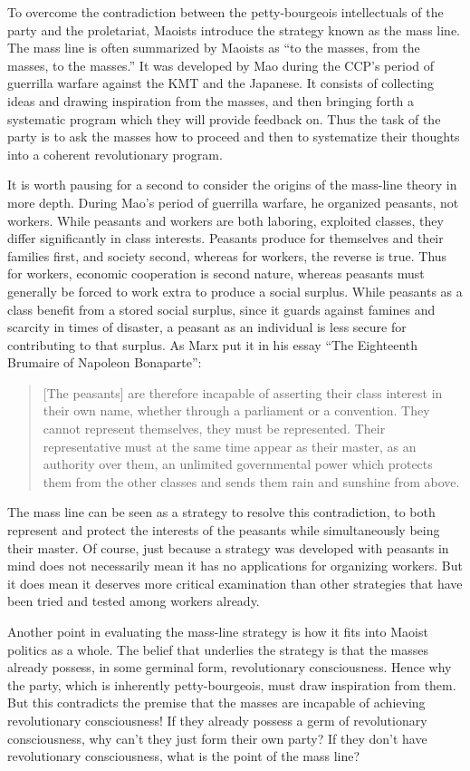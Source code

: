 To overcome the contradiction between the petty-bourgeois intellectuals of the party and the proletariat, Maoists introduce the strategy known as the mass line. The mass line is often summarized by Maoists as ``to the masses, from the masses, to the masses.'' It was developed by Mao during the CCP's period of guerrilla warfare against the KMT and the Japanese. It consists of collecting ideas and drawing inspiration from the masses, and then bringing forth a systematic program which they will provide feedback on. Thus the task of the party is to ask the masses how to proceed and then to systematize their thoughts into a coherent revolutionary program.

It is worth pausing for a second to consider the origins of the mass-line theory in more depth. During Mao's period of guerrilla warfare, he organized peasants, not workers. While peasants and workers are both laboring, exploited classes, they differ significantly in class interests. Peasants produce for themselves and their families first, and society second, whereas for workers, the reverse is true. Thus for workers, economic cooperation is second nature, whereas peasants must generally be forced to work extra to produce a social surplus. While peasants as a class benefit from a stored social surplus, since it guards against famines and scarcity in times of disaster, a peasant as an individual is less secure for contributing to that surplus. As Marx put it in his essay ``The Eighteenth Brumaire of Napoleon Bonaparte'':

\blockquote{[The peasants] are therefore incapable of asserting their class interest in their own name, whether through a parliament or a convention. They cannot represent themselves, they must be represented. Their representative must at the same time appear as their master, as an authority over them, an unlimited governmental power which protects them from the other classes and sends them rain and sunshine from above.}

The mass line can be seen as a strategy to resolve this contradiction, to both represent and protect the interests of the peasants while simultaneously being their master. Of course, just because a strategy was developed with peasants in mind does not necessarily mean it has no applications for organizing workers. But it does mean it deserves more critical examination than other strategies that have been tried and tested among workers already.

Another point in evaluating the mass-line strategy is how it fits into Maoist politics as a whole. The belief that underlies the strategy is that the masses already possess, in some germinal form, revolutionary consciousness. Hence why the party, which is inherently petty-bourgeois, must draw inspiration from them. But this contradicts the premise that the masses are incapable of achieving revolutionary consciousness! If they already possess a germ of revolutionary consciousness, why can't they just form their own party? If they don't have revolutionary consciousness, what is the point of the mass line?

